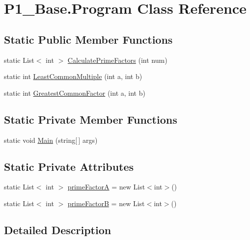 \hypertarget{class_p1___base_1_1_program}{\section{P1\-\_\-\-Base.\-Program Class Reference}
\label{class_p1___base_1_1_program}
}
\subsection*{Static Public Member Functions}
\begin{DoxyCompactItemize}
\item 
static List$<$ int $>$ \hyperlink{class_p1___base_1_1_program_a2efc0cfb173d9412a525b1657335c150}{Calculate\-Prime\-Factors} (int num)
\item 
static int \hyperlink{class_p1___base_1_1_program_a771ba62e167d841cc2bb0213e5daf1a9}{Least\-Common\-Multiple} (int a, int b)
\item 
static int \hyperlink{class_p1___base_1_1_program_a647a21fde18592bc0f35077d07d60476}{Greatest\-Common\-Factor} (int a, int b)
\end{DoxyCompactItemize}
\subsection*{Static Private Member Functions}
\begin{DoxyCompactItemize}
\item 
static void \hyperlink{class_p1___base_1_1_program_aacae8edf45b15eff203ad95d08a6d39b}{Main} (string\mbox{[}$\,$\mbox{]} args)
\end{DoxyCompactItemize}
\subsection*{Static Private Attributes}
\begin{DoxyCompactItemize}
\item 
static List$<$ int $>$ \hyperlink{class_p1___base_1_1_program_a5a1d1aaa0c9be4b481faddab1e1ab753}{prime\-Factor\-A} = new List$<$int$>$()
\item 
static List$<$ int $>$ \hyperlink{class_p1___base_1_1_program_ab76652179b4151a50e1fadf328abdb44}{prime\-Factor\-B} = new List$<$int$>$()
\end{DoxyCompactItemize}


\subsection{Detailed Description}


